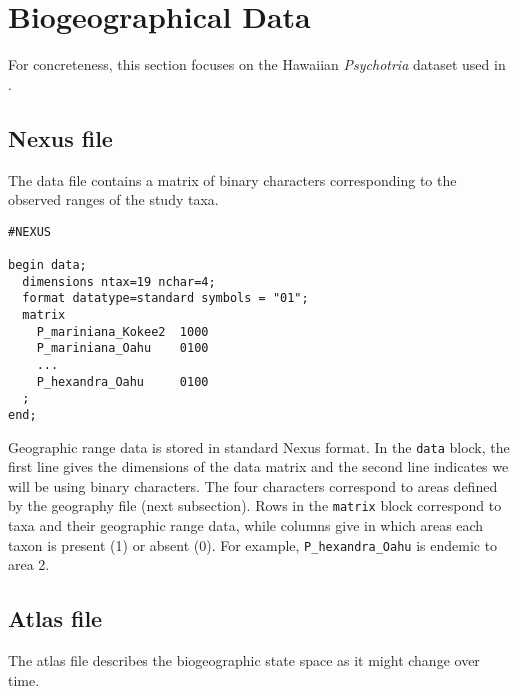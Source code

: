 \section{Biogeographical Data}

For concreteness, this section focuses on the Hawaiian {\it Psychotria} dataset used in \citet{ree08}.

\subsection{Nexus file}

The data file contains a matrix of binary characters corresponding to the observed ranges of the study taxa.

\begin{framed}
\begin{lstlisting}
#NEXUS

begin data;
  dimensions ntax=19 nchar=4;
  format datatype=standard symbols = "01";
  matrix
    P_mariniana_Kokee2  1000
    P_mariniana_Oahu    0100
    ...
    P_hexandra_Oahu     0100
  ;
end;
\end{lstlisting}
\end{framed}

Geographic range data is stored in standard Nexus format.
In the {\tt data} block, the first line gives the dimensions of the data matrix and the second line indicates we will be using binary characters.
The four characters correspond to areas defined by the geography file (next subsection).
Rows in the {\tt matrix} block correspond to taxa and their geographic range data, while columns give in which areas each taxon is present (1) or absent (0).
For example, {\tt P\_hexandra\_Oahu} is endemic to area 2.

\subsection{Atlas file}

The atlas file describes the biogeographic state space as it might change over time.

